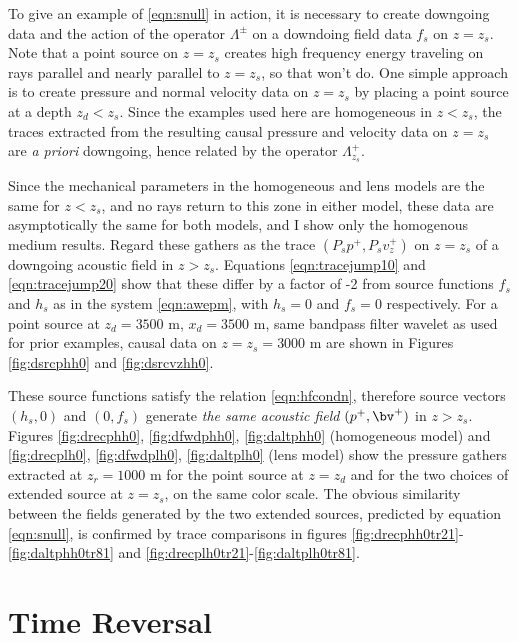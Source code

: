 To give an example of \ref{eqn:snull} in action, it is necessary to
create downgoing data and the action of the operator $\Lambda^{\pm}$
on a downdoing field data $f_s$ on $z=z_s$. Note that a point source
on $z=z_s$ creates high frequency energy traveling on rays parallel
and nearly parallel to $z=z_s$, so that won't do. One simple approach
is to create pressure and normal velocity data on $z=z_s$ by placing a
point source at a depth $z_d<z_s$. Since the examples used here are
homogeneous in $z<z_s$, the traces extracted from the resulting
causal pressure and velocity data on $z=z_s$ are {\em a priori}
downgoing, hence related by the operator $\Lambda^+_{z_s}$.

Since the
mechanical parameters in the homogeneous and lens models are the same
for $z<z_s$, and no rays return to this zone in either model, these
data are asymptotically the same for both models, and I show only the
homogenous medium results. Regard these gathers as the trace
$(P_sp^+,P_sv^+_z)$ on $z=z_s$ of a downgoing acoustic field in $z>z_s$.
Equations \ref{eqn:tracejump10} and
\ref{eqn:tracejump20} show that these differ by a factor of -2 from
source functions $f_s$ and $h_s$ as in the system \ref{eqn:awepm},
with $h_s=0$ and $f_s=0$ respectively. For a point source at $z_d=3500$ m, $x_d=3500$ m, same bandpass filter
wavelet as used for prior examples, causal data on $z=z_s=3000$ m are
shown in Figures \ref{fig:dsrcphh0} and \ref{fig:dsrcvzhh0}. 

These source functions satisfy
the relation \ref{eqn:hfcondn}, therefore source vectors $(h_s,0)$ and
$(0, f_s)$ generate {\em the same acoustic field} $(p^+,\bv^+)$ in $z>z_s$. Figures
\ref{fig:drecphh0}, \ref{fig:dfwdphh0}, \ref{fig:daltphh0} (homogeneous model) and
\ref{fig:drecplh0}, \ref{fig:dfwdplh0}, \ref{fig:daltplh0} (lens model) show the pressure
gathers extracted at $z_r=1000$ m for the point source at $z=z_d$ and
for the two choices of extended source at $z=z_s$, on the same color
scale. The obvious similarity between the fields generated by the two
extended sources,
predicted by equation \ref{eqn:snull}, is confirmed by trace
comparisons in figures \ref{fig:drecphh0tr21}-\ref{fig:daltphh0tr81}
and
\ref{fig:drecplh0tr21}-\ref{fig:daltplh0tr81}.


\section{Time Reversal}


